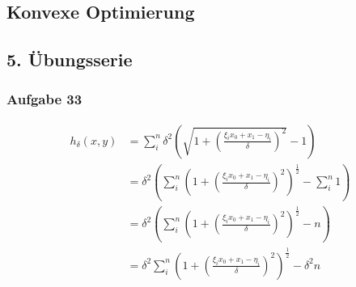 \documentclass{article}
\begin{document}
\begin{center}
	\section*{Konvexe Optimierung}
	\subsection*{5. Übungsserie}
\end{center}

\subsubsection*{Aufgabe 33}


\newcommand{\thefunc}{\xi_i^2 x_0^2 + 2 \xi_i x_0 x_1 - 2\xi_i x_0 \eta_i + x_1^2 -2 x_1 \eta_i   + \eta_i^2}
\newcommand{\z}{\xi_i x_0 + x_1 -\eta_i}


 \begin{align*}
 h_\delta(x,y) 	&= \sum\limits_i^n \delta^2 \left( \sqrt{1+\left( \frac { \xi_i x_0 + x_1 -\eta_i}{\delta} \right)^2} -1 \right)\\
 				&= \delta^2 \left( \sum\limits_i^n \left(1+\left( \frac { \xi_i x_0 + x_1 -\eta_i}{\delta} \right)^2\right)^\frac{1}{2} -\sum\limits_i^n 1 \right)\\
 				&= \delta^2 \left( \sum\limits_i^n \left(1+\left( \frac { \xi_i x_0 + x_1 -\eta_i}{\delta} \right)^2\right)^\frac{1}{2} -n \right)\\
 				&= \delta^2 \sum\limits_i^n \left(1+\left( \frac { \xi_i x_0 + x_1 -\eta_i}{\delta} \right)^2\right)^\frac{1}{2} - \delta^2 n \\
\end{align*}
\newcommand{\dfunca}{2\xi_i^2 x_0 + 2 \xi_i x_1 - 2\xi_i \eta_i -2 x_1 \eta_i}
\end{document}

